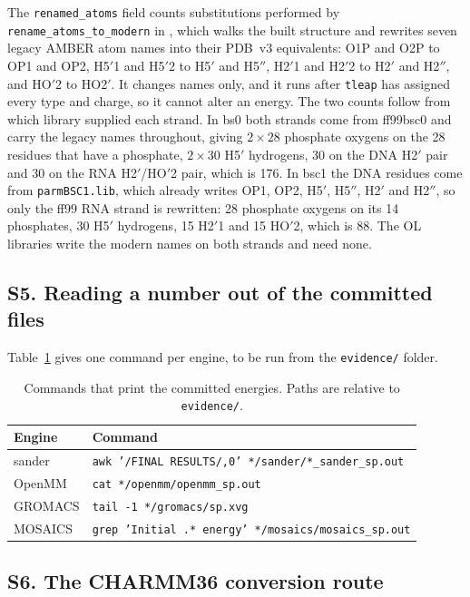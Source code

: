 The \texttt{renamed\_atoms} field counts substitutions performed by
\texttt{rename\_atoms\_to\_modern} in
, which walks the built
structure and rewrites seven legacy AMBER atom names into their PDB~v3
equivalents: O1P and O2P to OP1 and OP2, H5$'$1 and H5$'$2 to H5$'$ and
H5$''$, H2$'$1 and H2$'$2 to H2$'$ and H2$''$, and HO$'$2 to HO2$'$. It changes
names only, and it runs after \texttt{tleap} has assigned every type and
charge, so it cannot alter an energy. The two counts follow from which library
supplied each strand. In bs0 both strands come from ff99bsc0 and carry the
legacy names throughout, giving $2\times28$ phosphate oxygens on the 28
residues that have a phosphate, $2\times30$ H5$'$ hydrogens, 30 on the
DNA H2$'$ pair and 30 on the RNA H2$'$/HO$'$2 pair, which is 176. In bsc1 the
DNA residues come from \texttt{parmBSC1.lib}, which already writes OP1,
OP2, H5$'$, H5$''$, H2$'$ and H2$''$, so only the ff99 RNA strand is rewritten:
28 phosphate oxygens on its 14 phosphates, 30 H5$'$ hydrogens, 15 H2$'$1 and 15
HO$'$2, which is 88. The OL libraries write the modern names on both strands and
need none.

\subsection*{S5. Reading a number out of the committed files}

Table~\ref{tab:si-commands} gives one command per engine, to be run from
the \texttt{evidence/} folder.

\begin{table}[h]
\centering
\footnotesize
\caption{Commands that print the committed energies. Paths are relative to
\texttt{evidence/}.}
\label{tab:si-commands}
\begin{tabular}{ll}
\toprule
Engine & Command \\
\midrule
sander  & \texttt{awk '/FINAL RESULTS/,0' */sander/*\_sander\_sp.out} \\
OpenMM  & \texttt{cat */openmm/openmm\_sp.out} \\
GROMACS & \texttt{tail -1 */gromacs/sp.xvg} \\
MOSAICS & \texttt{grep 'Initial .* energy' */mosaics/mosaics\_sp.out} \\
\bottomrule
\end{tabular}
\end{table}

\subsection*{S6. The CHARMM36 conversion route}

